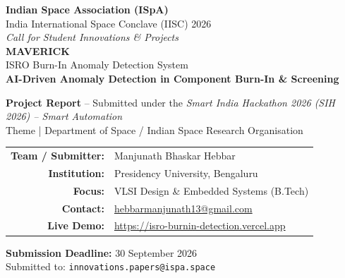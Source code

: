 \documentclass[11pt,a4paper]{article}
\begin{document}
\begin{titlepage}
  \centering
  \vspace*{1cm}

  {\Large\textcolor{isroorange}{\textbf{Indian Space Association (ISpA)}}}\\[0.3cm]
  {\large India International Space Conclave (IISC) 2026}\\[0.3cm]
  {\large \textit{Call for Student Innovations \& Projects}}\\[2.5cm]

  {\Huge\bfseries\color{isroblue} MAVERICK}\\[0.8cm]
  {\LARGE ISRO Burn-In Anomaly Detection System}\\[0.5cm]
  {\large \textbf{AI-Driven Anomaly Detection in Component Burn-In \& Screening}}\\[2.2cm]

  \begin{infobox}
    \centering
    \textbf{Project Report} -- Submitted under the
    \textit{Smart India Hackathon 2026 (SIH 2026) -- Smart Automation}\\
    Theme | Department of Space / Indian Space Research Organisation
  \end{infobox}

  \vspace{1.5cm}
  \begin{tabular}{rl}
    \textbf{Team / Submitter:} & Manjunath Bhaskar Hebbar \\
    \textbf{Institution:}      & Presidency University, Bengaluru \\
    \textbf{Focus:}            & VLSI Design \& Embedded Systems (B.Tech) \\
    \textbf{Contact:}          & \href{mailto:hebbarmanjunath13@gmail.com}{hebbarmanjunath13@gmail.com} \\
    \textbf{Live Demo:}        & \url{https://isro-burnin-detection.vercel.app} \\
  \end{tabular}

  \vfill
  {\large \textbf{Submission Deadline:} 30 September 2026}\\[0.4cm]
  {\large Submitted to: \texttt{innovations.papers@ispa.space}}
\end{titlepage}

\clearpage
\tableofcontents
\clearpage
\end{document}
